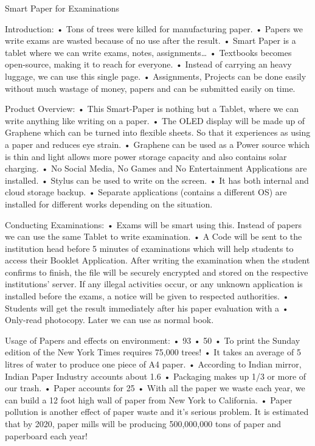 Smart Paper for Examinations

Introduction:
•	Tons of trees were killed for manufacturing paper.
•	Papers we write exams are wasted because of no use after the result.
•	Smart Paper is a tablet where we can write exams, notes, assignments…
•	Textbooks becomes open-source, making it to reach for everyone.
•	Instead of carrying an heavy luggage, we can use this single page.
•	Assignments, Projects can be done easily without much wastage of money,
papers and can be submitted easily on time.

Product Overview:
•	This Smart-Paper is nothing but a Tablet, where we can write anything like
writing on a paper.
•	The OLED display will be made up of Graphene which can be turned into
flexible sheets. So that it experiences as using a paper and reduces eye strain.
•	Graphene can be used as a Power source which is thin and light allows
more power storage capacity and also contains solar charging.
•	No Social Media, No Games and No Entertainment Applications are
installed.
•	Stylus can be used to write on the screen.
•	It has both internal and cloud storage backup.
•	Separate applications (contains a different OS) are installed for different works depending on the situation.

Conducting Examinations:
•	Exams will be smart using this. Instead of papers we can use the same
Tablet to write examination.
•	A Code will be sent to the institution head before 5 minutes of examinations which will help students to access their Booklet Application. After writing the
examination when the student confirms to finish, the file will be securely
encrypted and stored on the respective institutions’ server. If any illegal
activities occur, or any unknown application is installed before the exams,
a notice will be given to respected authorities.
•	Students will get the result immediately after his paper evaluation with a
•	Only-read photocopy. Later we can use as normal book.

Usage of Papers and effects on environment: 
• 93%
• 50%
• To print the Sunday edition of the New York Times requires 75,000 trees! 
• It takes an average of 5 litres of water to produce one piece of A4 paper. 
• According to  Indian mirror, Indian Paper Industry accounts about 1.6%
• Packaging makes up 1/3 or more of our trash. 
• Paper accounts for 25%
• With all the paper we waste each year, we can build a 12 foot high wall of paper from New York to California. 
• Paper pollution is another effect of paper waste and it’s serious problem. It is estimated that by 2020, paper mills will be producing 500,000,000 tons of paper and paperboard each year! 
 
